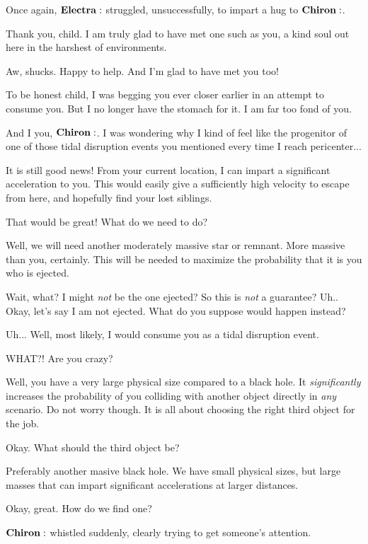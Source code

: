 Once again, $\Electra$ struggled, unsuccessfully, to impart a hug to $\Chiron$.

\Chiron Thank you, child.  I am truly glad to have met one such as you, a kind soul out here in the harshest of environments.

\Electra Aw, shucks.  Happy to help.  And I'm glad to have met you too!

\Chiron To be honest child, I was begging you ever closer earlier in an attempt to consume you.  But I no longer have the stomach for it.  I am far too fond of you.

\Electra And I you, $\Chiron$.  I was wondering why I kind of feel like the progenitor of one of those tidal disruption events you mentioned every time I reach pericenter...

\Chiron It is still good news!  From your current location, I can impart a significant acceleration to you.  This would easily give a sufficiently high velocity to escape from here, and hopefully find your lost siblings.

\Electra  That would be great!  What do we need to do?

\Chiron Well, we will need another moderately massive star or remnant.  More massive than you, certainly.  This will be needed to maximize the probability that it is you who is ejected.

\Electra Wait, what?  I might \textit{not} be the one ejected?  So this is \textit{not} a guarantee?  Uh.. Okay, let's say I am not ejected.  What do you suppose would happen instead?

\Chiron Uh... Well, most likely, I would consume you as a tidal disruption event.

\Electra WHAT?!  Are you crazy? 

\Chiron Well, you have a very large physical size compared to a black hole.  It \textit{significantly} increases the probability of you colliding with another object directly in \textit{any} scenario.  Do not worry though.  It is all about choosing the right third object for the job.  

\Electra Okay.  What should the third object be?

\Chiron Preferably another masive black hole.  We have small physical sizes, but large masses that can impart significant accelerations at larger distances.

\Electra Okay, great.  How do we find one?

$\Chiron$ whistled suddenly, clearly trying to get someone's attention.

